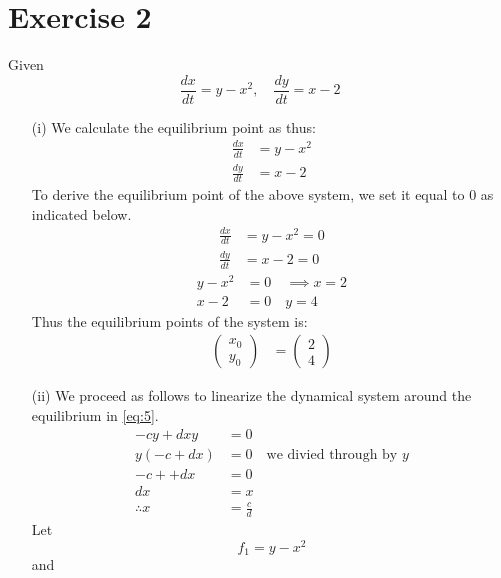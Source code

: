 \documentclass[12pt,a4paper]{article}
\begin{document}
\section*{Exercise 2}
Given 
\begin{equation}
		\frac{dx}{dt} =  y - x^2, \quad
		\frac{dy}{dt} = x -2
		\label{eq:5}
\end{equation}
\begin{enumerate}
							\item[(i)]   We calculate the equilibrium point as thus:
								\begin{eqnarray}
										\label{eq:6}
										\frac{dx}{dt}  &=  y - x^2 \\
										\label{eq:7}
										\frac{dy}{dt}  &= x -2
								\end{eqnarray}
								To derive the equilibrium point of the above system,  we set it equal to 0 as indicated below.
							\begin{align*}
										\frac{dx}{dt}  &=  y - x^2 = 0 \\
									   \frac{dy}{dt}  &= x -2  = 0
								\end{align*}
								\begin{align*}
								       y - x^2 &= 0 \quad \implies x  = 2 \\
									   x -2  &= 0 \quad y = 4
								\end{align*}
								Thus the equilibrium points of the system is:
								\begin{align*}
										\begin{pmatrix}
												x_0 \\
												y_0
										\end{pmatrix}  &= \begin{pmatrix}
												2\\
												4
										\end{pmatrix}
								\end{align*}
							\item[(ii)]We proceed as follows to linearize the dynamical system around the equilibrium in \eqref{eq:5}.
							\begin{align*}
									-cy + dxy  &= 0\\
									y(-c + dx) &=  0 \quad \text{we divied through by }  y\\ 
									-c + + dx  &= 0\\
									dx  &=  x\\
									\therefore x &= \frac{c}{d}
							\end{align*}
									Let
\begin{equation}
 f_1= y-x^2       \label{c4}
\end{equation}
and


\end{enumerate}
\end{document}

